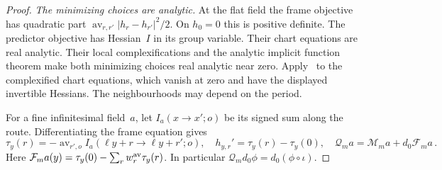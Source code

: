 \begin{proof}
\emph{The minimizing choices are analytic.} At the flat field the frame objective has quadratic part $\operatorname{av}_{r,r'}|h_r-h_{r'}|^2/2$. On $h_0=0$ this is positive definite. The predictor objective has Hessian~$I$ in its group variable. Their chart equations are real analytic. Their local complexifications and the analytic implicit function theorem make both minimizing choices real analytic near zero. Apply~\cite[Theorem~1.3.8]{Lebl2026} to the complexified chart equations, which vanish at zero and have the displayed invertible Hessians. The neighbourhoods may depend on the period.

For a fine infinitesimal field~$a$, let $I_a(x\to x';o)$ be its signed sum along the route. Differentiating the frame equation gives
\begin{equation*}
\tau_y(r)=-\operatorname{av}_{r',o}I_a(\ell y+r\to\ell y+r';o),\quad
h_{y,r}'=\tau_y(r)-\tau_y(0),\quad
\mathcal Q_ma=\mathcal M_ma+d_0\mathcal F_ma\,.
\end{equation*}
Here $\mathcal F_ma(y)=\tau_y(0)-\sum_rw_r^{\rm av}\tau_y(r)$. In particular $\mathcal Q_md_0\phi=d_0(\phi\circ\iota)$.


\end{proof}
